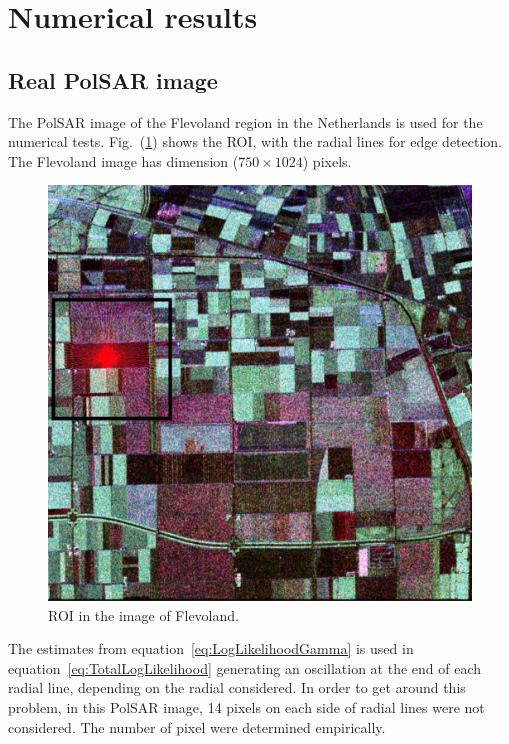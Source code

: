 \documentclass[journal]{IEEEtran}
\begin{document}
\section{Numerical results}\label{sec_05}

\subsection{Real PolSAR image}
The PolSAR image of the Flevoland region in the Netherlands is used for the numerical tests. 
Fig.~(\ref{flevoland_radial_4look}) shows the ROI, with the radial lines for edge detection. The Flevoland image has dimension ($750\times 1024$) pixels.

\begin{figure}[hbt]
\centering
	\includegraphics[width=\linewidth]{flevoland_radial_4_look_black}
	\caption{ROI in the image of Flevoland.}
\label{flevoland_radial_4look}
\end{figure}

The estimates from equation~\eqref{eq:LogLikelihoodGamma} is used in equation~\eqref{eq:TotalLogLikelihood} generating an oscillation at the end of each radial line, depending on the radial considered. In order to get around this problem, in this PolSAR image, 14 pixels on each side of radial lines were not considered. The number of pixel were determined empirically.
\end{document}
